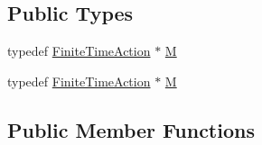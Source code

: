 \subsection*{Public Types}
\begin{DoxyCompactItemize}
\item 
typedef \hyperlink{classFiniteTimeAction}{Finite\+Time\+Action} $\ast$ \hyperlink{classSequence_a6f34f8a978819442ffa4e9517ed49c10}{M}
\item 
typedef \hyperlink{classFiniteTimeAction}{Finite\+Time\+Action} $\ast$ \hyperlink{classSequence_a6f34f8a978819442ffa4e9517ed49c10}{M}
\end{DoxyCompactItemize}
\subsection*{Public Member Functions}
